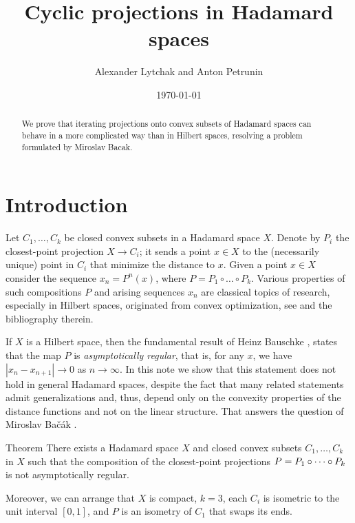 \documentclass[a4paper,10pt]{article}
\def\thetitle{Cyclic projections in Hadamard spaces}
\def\theauthors{Alexander Lytchak and Anton Petrunin}
\begin{document}
\title{\thetitle}	
\author{\theauthors}
\date{\today}
\maketitle

\begin{abstract}
	We  prove that iterating projections onto convex subsets of Hadamard spaces can behave in a more complicated way than in Hilbert spaces, resolving a problem formulated by Miroslav Bacak. 	
\end{abstract}


\section{Introduction}


Let  $C_1,\dots, C_k$ be closed convex subsets in a Hadamard space $X$.
Denote by $P_i$ the closest-point projection $X\to C_i$; it sends a point $x\in X$ to the (necessarily unique) point in $C_i$ that minimize the distance to $x$.
Given a point $x\in X$ consider the sequence $x_n=P^n(x)$, where
$P= P_1\circ \dots \circ P_k$.
Various properties of such compositions  $P$ and arising  sequences $x_n$
are classical topics of research, especially in Hilbert spaces, originated from convex optimization, see \cite{Bac, Bac2, Bauschke, bauschke-borwein-lewis,deutsch-hundal}
and the bibliography therein.

If $X$ is a Hilbert space, then the fundamental result of Heinz Bauschke \cite{Bauschke,Kohlenbach}, states that the map $P$ is \emph{asymptotically regular}, that is, for any $x$, we have  $|x_n-x_{n+1}|\to 0$ as $n\to \infty$.
In this note we show that this statement does not hold in general Hadamard spaces, despite the fact that many related statements
admit generalizations and, thus, depend only on the convexity properties of the distance functions and not on the linear structure. 
That answers the question of Miroslav Bačák \cite[Problem 6.13]{Bac}.

\begin{thm}{Theorem}\label{thm}
There exists a Hadamard space $X$ and closed convex subsets $C_1,\dots,C_k$ in $X$ such that the composition of the closest-point projections $P\z= P_1\circ \dots \circ P_k$ is not asymptotically regular.

Moreover, we can arrange that $X$ is compact, $k=3$, each $C_i$ is isometric to the unit interval $[0,1]$, 
and $P$ is an isometry of $C_1$ that swaps its ends.
\end{thm}
\end{document}
